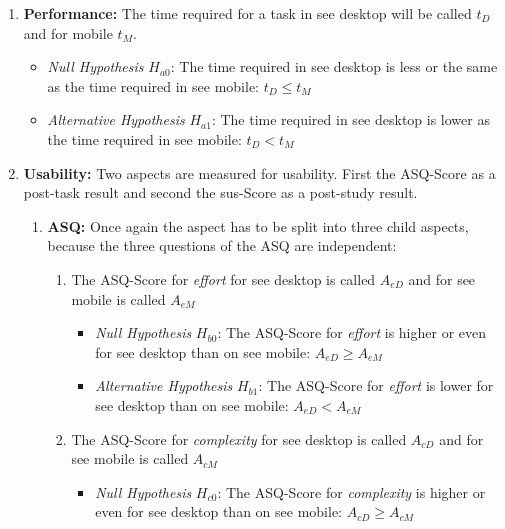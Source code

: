 \begin{enumerate}[{label=\alph*)}]
  \item \textbf{Performance:} The time required for a task in \gls{see} desktop will be called $t_D$ and for mobile $t_M$.
        \begin{itemize}
          \item \textit{Null Hypothesis} $H_{a0}$: The time required in \gls{see} desktop is less or the same as the time required in \gls{see} mobile: $t_D \leq t_M$
          \item \textit{Alternative Hypothesis} $H_{a1}$: The time required in {\gls{see}} desktop is lower as the time required in \gls{see} mobile: $t_D < t_M$
        \end{itemize}
  \item \textbf{Usability:} Two aspects are measured for \gls{usability}. First the \gls{ASQ}-Score as a \gls{post-task} result and second the \gls{sus}-Score as a \gls{post-study} result.
        \begin{enumerate}[label=\roman*)]
          \item \textbf{ASQ:} Once again the aspect has to be split into three child aspects, because the three questions of the \gls{ASQ} are independent:
                \begin{enumerate}[{label=\arabic*)}]
                  \item The \gls{ASQ}-Score for \textit{effort} for \gls{see} desktop is called $A_{eD}$ and for \gls{see} mobile is called $A_{eM}$
                        \begin{itemize}
                          \item \textit{Null Hypothesis} $H_{b0}$: The \gls{ASQ}-Score for \textit{effort} is higher or even for \gls{see} desktop than on \gls{see} mobile: $A_{eD} \geq A_{eM}$
                          \item \textit{Alternative Hypothesis} $H_{b1}$: The \gls{ASQ}-Score for \textit{effort} is lower for \gls{see} desktop than on \gls{see} mobile: $A_{eD} < A_{eM}$
                        \end{itemize}
                  \item The \gls{ASQ}-Score for \textit{complexity} for \gls{see} desktop is called $A_{cD}$ and for \gls{see} mobile is called $A_{cM}$
                        \begin{itemize}
                          \item \textit{Null Hypothesis} $H_{c0}$: The \gls{ASQ}-Score for \textit{complexity} is higher or even for \gls{see} desktop than on \gls{see} mobile: $A_{cD} \geq A_{cM}$

\end{itemize}
\end{enumerate}
\end{enumerate}
\end{enumerate}
